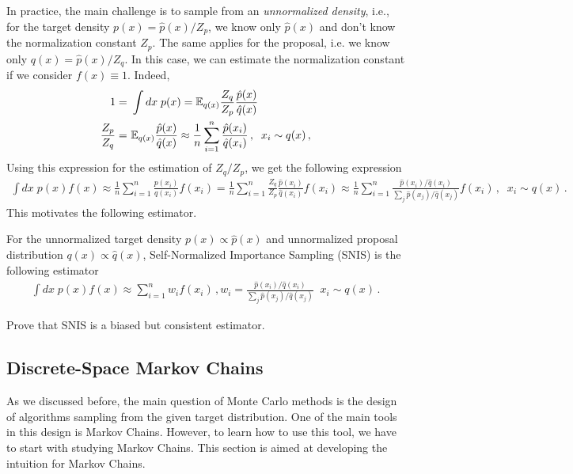 In practice, the main challenge is to sample from an \textit{unnormalized density}, i.e., for the target density $p(x) = \hat{p}(x)/Z_p$, we know only $\hat{p}(x)$ and don't know the normalization constant $Z_p$. The same applies for the proposal, i.e. we know only $q(x) = \hat{p}(x)/Z_q$. In this case, we can estimate the normalization constant if we consider $f(x)\equiv 1$. Indeed,
\begin{align}
    1 =~& \int dx\;p(x) = \mathbb{E}_{q(x)}\frac{Z_q}{Z_p}\frac{\hat{p}(x)}{\hat{q}(x)}\\
    \frac{Z_p}{Z_q} =~& \mathbb{E}_{q(x)}\frac{\hat{p}(x)}{\hat{q}(x)} \approx \frac{1}{n}\sum_{i=1}^n \frac{\hat{p}(x_i)}{\hat{q}(x_i)}\,,\;\; x_i \sim q(x)\,,
\end{align}
Using this expression for the estimation of $Z_q/Z_p$, we get the following expression
\begin{align}
    \int dx\; p(x)f(x) \approx \frac{1}{n}\sum_{i=1}^n\frac{p(x_i)}{q(x_i)}f(x_i) = \frac{1}{n}\sum_{i=1}^n\frac{Z_q}{Z_p}\frac{\hat{p}(x_i)}{\hat{q}(x_i)}f(x_i) \approx \frac{1}{n}\sum_{i=1}^n\frac{\hat{p}(x_i)/\hat{q}(x_i)}{\sum_j \hat{p}(x_j)/\hat{q}(x_j)} f(x_i) \,, \;\; x_i \sim q(x)\,.
\end{align}
This motivates the following estimator.
\begin{mybox}
\begin{definition}
    For the unnormalized target density $p(x)\propto \hat{p}(x)$ and unnormalized proposal distribution $q(x)\propto \hat{q}(x)$, Self-Normalized Importance Sampling (SNIS) is the following estimator
    \begin{align}
        \int dx\;p(x)f(x)\approx \sum_{i=1}^n w_i f(x_i)\,, w_i = \frac{\hat{p}(x_i)/\hat{q}(x_i)}{\sum_j \hat{p}(x_j)/\hat{q}(x_j)}\;\; x_i \sim q(x)\,.
    \end{align}
\end{definition}
\end{mybox}
\begin{exercise}
    Prove that SNIS is a biased but consistent estimator.
\end{exercise}

\subsection{Discrete-Space Markov Chains}

As we discussed before, the main question of Monte Carlo methods is the design of algorithms sampling from the given target distribution. One of the main tools in this design is Markov Chains. However, to learn how to use this tool, we have to start with studying Markov Chains. This section is aimed at developing the intuition for Markov Chains.

